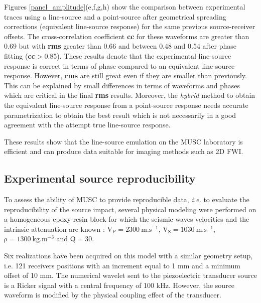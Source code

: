 \documentclass[manuscript,revised]{geophysics}
\begin{document}
\noindent Figures \ref{panel_amplitude}(e,f,g,h) show the comparison between experimental traces using a line-source and a point-source after geometrical spreading corrections (equivalent line-source response) for the same previous source-receiver offsets. The cross-correlation coefficient \textbf{cc} for these waveforms are greater than 0.69 but with \textbf{rms} greater than 0.66 and between 0.48 and 0.54 after phase fitting (\textbf{cc}$>$0.85). These results denote that the experimental line-source response is correct in terms of phase compared to an equivalent line-source response. However, \textbf{rms} are still great even if they are smaller than previously. This can be explained by small differences in terms of waveforms and phases which are critical in the final \textbf{rms} results. Moreover, the \textit{hybrid} method to obtain the equivalent line-source response from a point-source response needs accurate parametrization to obtain the best result which is not necessarily in a good agreement with the attempt true line-source response.   

\noindent These results show that the line-source emulation on the MUSC laboratory is efficient and can produce data suitable for imaging methods such as 2D FWI.


\subsection{Experimental source reproducibility}

\noindent To assess the ability of MUSC to provide reproducible data, \textit{i.e.} to evaluate the reproducibility of the source impact, several physical modeling were performed on a homogeneous epoxy-resin block for which the seismic waves velocities and the intrinsic attenuation are known : $\mathrm{V_{P}=2300\ m.s^{-1}}$, $\mathrm{V_{S}=1030\ m.s^{-1}}$, $\mathrm{\rho=1300\ kg.m^{-3}}$ and $\mathrm{Q=30}$. 

\noindent Six realizations have been acquired on this model with a similar geometry setup, i.e. 121 receivers positions with an increment equal to 1 mm and a minimum offset of 10 mm. The numerical wavelet sent to the piezoelectric transducer source is a Ricker signal with a central frequency of 100 kHz. However, the source waveform is modified by the physical coupling effect of the transducer. 
\end{document}
